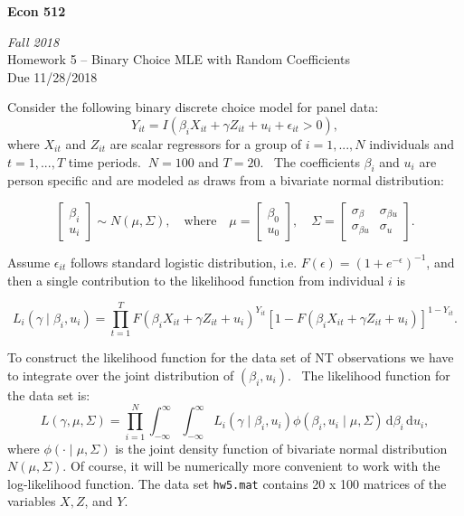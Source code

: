 \documentclass[10pt]{article}
\begin{document}
\begin{center}
\textbf{Econ 512}

\emph{Fall 2018}\\[1em]

Homework 5 -- Binary Choice MLE with Random Coefficients\\
Due 11/28/2018 \\[3em]
\end{center}


Consider the following binary discrete choice model for panel data:
\begin{equation*}
Y_{it}=I\left( \beta _{i}X_{it}+\gamma Z_{it}+u_{i}+\epsilon _{it}>0\right) ,
\end{equation*}
where $X_{it}$ and $Z_{it}$ are scalar regressors for a group of $i=1,...,N$ individuals and $t=1,...,T$ time periods. $\ N=100$ and $T=20$. \ The coefficients $\beta _{i}$ and $u_{i}$ are person specific and are modeled as draws from a bivariate normal distribution:

\begin{equation*}
\begin{bmatrix}
\beta _{i} \\ 
u_{i}%
\end{bmatrix}%
\sim N(\mu ,\Sigma ),\quad \text{where}\quad \mu =%
\begin{bmatrix}
\beta _{0} \\ 
u_{0}%
\end{bmatrix}%
,\quad \Sigma =%
\begin{bmatrix}
\sigma _{\beta } & \sigma _{\beta u} \\ 
\sigma _{\beta u} & \sigma _{u}%
\end{bmatrix}%
.
\end{equation*}

Assume $\epsilon _{it}$ follows standard logistic distribution, i.e. $%
F(\epsilon )=\left( 1+e^{-\epsilon }\right) ^{-1}$, and then a single
contribution to the likelihood function from individual $i$ is

\begin{equation*}
L_{i}(\gamma \mid \beta _{i},u_{i})=\prod_{t=1}^{T}F(\beta _{i}X_{it}+\gamma
Z_{it}+u_{i})^{Y_{it}}\left[ 1-F(\beta _{i}X_{it}+\gamma Z_{it}+u_{i})\right]
^{1-Y_{it}}.
\end{equation*}

To construct the likelihood function for the data set of NT observations we
have to integrate over the joint distribution of $(\beta _{i},u_{i})$. \ The
likelihood function for the data set is: 
\begin{equation*}
L(\gamma ,\mu ,\Sigma )=\prod_{i=1}^{N}\int_{-\infty }^{\infty
}\int_{-\infty }^{\infty }L_{i}(\gamma \mid \beta _{i},u_{i})\phi (\beta
_{i},u_{i}\mid \mu ,\Sigma )\,\mathrm{d}\beta _{i}\,\mathrm{d}u_{i},
\end{equation*}%
where $\phi (\cdot \mid \mu ,\Sigma )$ is the joint density function of
bivariate normal distribution $N(\mu ,\Sigma )$.  Of course, it will be numerically more convenient to work with the log-likelihood function. 
The data set {\tt hw5.mat} contains 20 x 100 matrices of the variables $X,Z$, and $Y$.
\end{document}
